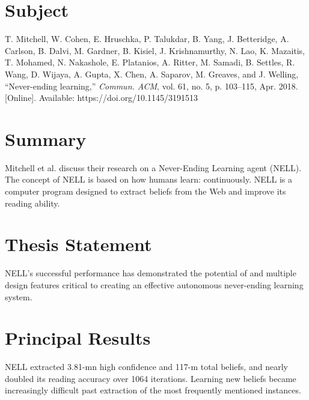\documentclass[12pt, letterpaper]{article}
\begin{document}
\pagestyle{empty}
\singlespacing
\vspace{1.0cm}

\newgeometry{} %


\section{Subject}
\label{sec:subject}
T. Mitchell, W. Cohen, E. Hruschka, P. Talukdar, B. Yang, J. Betteridge, A. Carlson, B. Dalvi, M. Gardner, B. Kisiel, J. Krishnamurthy, N. Lao, K. Mazaitis, T. Mohamed, N. Nakashole, E. Platanios, A. Ritter, M. Samadi, B. Settles, R. Wang, D. Wijaya, A. Gupta, X. Chen, A. Saparov, M. Greaves, and J. Welling, “Never-ending learning,” \emph{Commun. ACM}, vol. 61, no. 5, p. 103–115, Apr. 2018. [Online]. Available: https://doi.org/10.1145/3191513

\section{Summary}
\label{sec:summary}
Mitchell et al. discuss their research on a Never-Ending Learning agent (NELL). The concept of NELL is based on how humans learn: continuously. NELL is a computer program designed to extract beliefs from the Web and improve its reading ability.

\section{Thesis Statement}
\label{sec:thesis}
NELL's successful performance has demonstrated the potential of and multiple design features critical to creating an effective autonomous never-ending learning system.

\section{Principal Results}
\label{sec:principal}
NELL extracted 3.81-mn high confidence and 117-m total beliefs, and nearly doubled its reading accuracy over 1064 iterations. Learning new beliefs became increasingly difficult past extraction of the most frequently mentioned instances.
\end{document}
